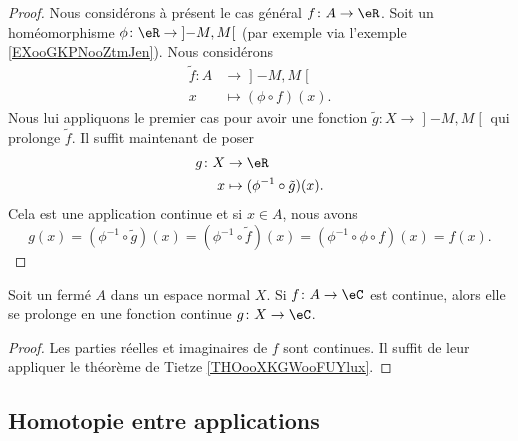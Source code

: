 \begin{proof}
    Nous considérons à présent le cas général \( f\colon A\to \eR\). Soit un homéomorphisme \( \phi\colon \eR\to \mathopen] -M , M \mathclose[\) (par exemple via l'exemple \ref{EXooGKPNooZtmJen}). Nous considérons
    \begin{equation}
        \begin{aligned}
        \tilde f\colon A&\to \mathopen] -M , M \mathclose[ \\
            x&\mapsto (\phi\circ f)(x). 
        \end{aligned}
    \end{equation}
    Nous lui appliquons le premier cas pour avoir une fonction \( \tilde g\colon X\to \mathopen] -M , M \mathclose[\) qui prolonge \( \tilde f\). Il suffit maintenant de poser
    \begin{equation}
        \begin{aligned}
            g\colon X&\to \eR \\
            x&\mapsto (\phi^{-1}\circ\tilde g)(x). 
        \end{aligned}
    \end{equation}
    Cela est une application continue et si \( x\in A\), nous avons
    \begin{equation}
        g(x)=(\phi^{-1}\circ \tilde g)(x)=(\phi^{-1}\circ \tilde f)(x)=(\phi^{-1}\circ\phi\circ f)(x)=f(x).
    \end{equation}
\end{proof}

\begin{corollary}
    Soit un fermé \( A\) dans un espace normal \( X\). Si \( f\colon A\to \eC\) est continue, alors elle se prolonge en une fonction continue \( g\colon X\to \eC\).
\end{corollary}

\begin{proof}
    Les parties réelles et imaginaires de \( f\) sont continues. Il suffit de leur appliquer le théorème de Tietze \ref{THOooXKGWooFUYlux}.
\end{proof}


\subsection{Homotopie entre applications}


